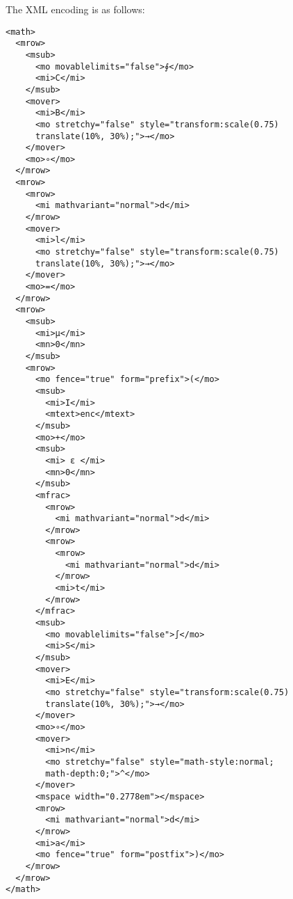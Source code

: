 The XML encoding is as follows:
\begin{verbatim}
<math>
  <mrow>
    <msub>
      <mo movablelimits="false">∮</mo>
      <mi>C</mi>
    </msub>
    <mover>
      <mi>B</mi>
      <mo stretchy="false" style="transform:scale(0.75) 
      translate(10%, 30%);">→</mo>
    </mover>
    <mo>∘</mo>
  </mrow>
  <mrow>
    <mrow>
      <mi mathvariant="normal">d</mi>
    </mrow>
    <mover>
      <mi>l</mi>
      <mo stretchy="false" style="transform:scale(0.75) 
      translate(10%, 30%);">→</mo>
    </mover>
    <mo>=</mo>
  </mrow>
  <mrow>
    <msub>
      <mi>μ</mi>
      <mn>0</mn>
    </msub>
    <mrow>
      <mo fence="true" form="prefix">(</mo>
      <msub>
        <mi>I</mi>
        <mtext>enc</mtext>
      </msub>
      <mo>+</mo>
      <msub>
        <mi> ε </mi>
        <mn>0</mn>
      </msub>
      <mfrac>
        <mrow>
          <mi mathvariant="normal">d</mi>
        </mrow>
        <mrow>
          <mrow>
            <mi mathvariant="normal">d</mi>
          </mrow>
          <mi>t</mi>
        </mrow>
      </mfrac>
      <msub>
        <mo movablelimits="false">∫</mo>
        <mi>S</mi>
      </msub>
      <mover>
        <mi>E</mi>
        <mo stretchy="false" style="transform:scale(0.75) 
        translate(10%, 30%);">→</mo>
      </mover>
      <mo>∘</mo>
      <mover>
        <mi>n</mi>
        <mo stretchy="false" style="math-style:normal;
        math-depth:0;">^</mo>
      </mover>
      <mspace width="0.2778em"></mspace>
      <mrow>
        <mi mathvariant="normal">d</mi>
      </mrow>
      <mi>a</mi>
      <mo fence="true" form="postfix">)</mo>
    </mrow>
  </mrow>
</math>
\end{verbatim}
